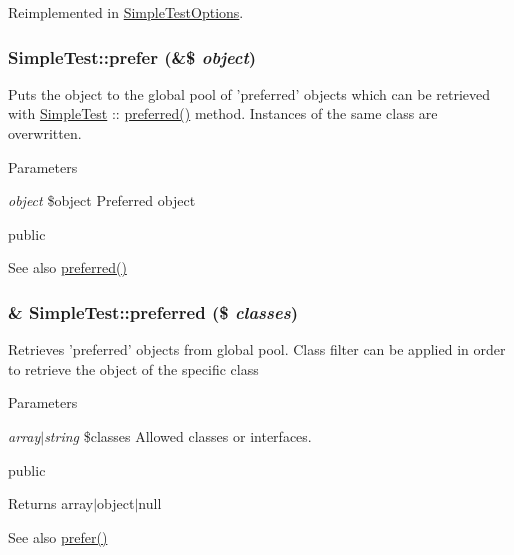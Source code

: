 Reimplemented in \hyperlink{class_simple_test_options_a5a043e7e1dd2070601d53a5282f8787e}{SimpleTestOptions}.\hypertarget{class_simple_test_a5735c92069dd08a3ff5779a20fdef80e}{
\subsubsection[{prefer}]{\setlength{\rightskip}{0pt plus 5cm}SimpleTest::prefer (\&\$ {\em object})}}
\label{class_simple_test_a5735c92069dd08a3ff5779a20fdef80e}
Puts the object to the global pool of 'preferred' objects which can be retrieved with \hyperlink{class_simple_test}{SimpleTest} :: \hyperlink{class_simple_test_a22e57646468cee812ebe7c4a4443d567}{preferred()} method. Instances of the same class are overwritten. 
\begin{DoxyParams}{Parameters}
\item[{\em object}]\$object Preferred object\end{DoxyParams}
public \begin{DoxySeeAlso}{See also}
\hyperlink{class_simple_test_a22e57646468cee812ebe7c4a4443d567}{preferred()} 
\end{DoxySeeAlso}
\hypertarget{class_simple_test_a22e57646468cee812ebe7c4a4443d567}{
\subsubsection[{preferred}]{\setlength{\rightskip}{0pt plus 5cm}\& SimpleTest::preferred (\$ {\em classes})}}
\label{class_simple_test_a22e57646468cee812ebe7c4a4443d567}
Retrieves 'preferred' objects from global pool. Class filter can be applied in order to retrieve the object of the specific class 
\begin{DoxyParams}{Parameters}
\item[{\em array$|$string}]\$classes Allowed classes or interfaces.\end{DoxyParams}
public \begin{DoxyReturn}{Returns}
array$|$object$|$null 
\end{DoxyReturn}
\begin{DoxySeeAlso}{See also}
\hyperlink{class_simple_test_a5735c92069dd08a3ff5779a20fdef80e}{prefer()} 
\end{DoxySeeAlso}
